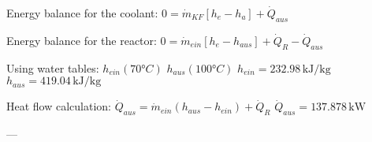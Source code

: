 Energy balance for the coolant:  
\( 0 = \dot{m}_{KF} [h_{e} - h_{a}] + \dot{Q}_{aus} \)  

Energy balance for the reactor:  
\( 0 = \dot{m}_{ein} [h_{e} - h_{aus}] + \dot{Q}_{R} - \dot{Q}_{aus} \)  

Using water tables:  
\( h_{ein} (70°C) \)  
\( h_{aus} (100°C) \)  
\( h_{ein} = 232.98 \, \text{kJ/kg} \)  
\( h_{aus} = 419.04 \, \text{kJ/kg} \)  

Heat flow calculation:  
\( \dot{Q}_{aus} = \dot{m}_{ein} (h_{aus} - h_{ein}) + \dot{Q}_{R} \)  
\( \dot{Q}_{aus} = 137.878 \, \text{kW} \)  

---